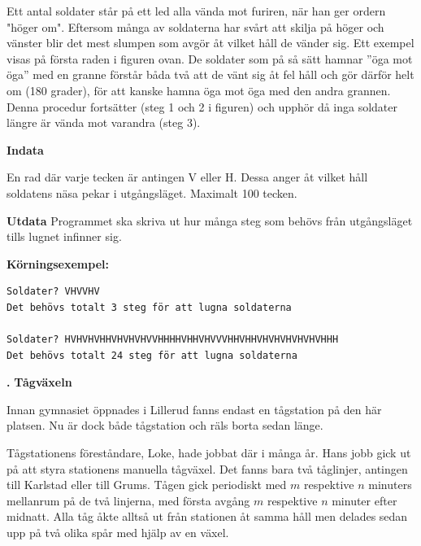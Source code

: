 \documentclass[a4paper,12pt]{article}
\newcounter{iii}\setcounter{iii}{0}
\def\i{\bigskip\noindent\refstepcounter{iii}\textbf{\arabic{iii}.} }
\begin{document}
Ett antal soldater står på ett led alla vända mot furiren, när han ger ordern "höger om". Eftersom många av soldaterna har svårt att skilja på höger och vänster blir det mest slumpen som avgör åt vilket håll de vänder sig. Ett exempel visas på första raden i figuren ovan. De soldater som på så sätt hamnar ''öga mot öga'' med en granne förstår båda två att de vänt sig åt fel håll och gör därför helt om (180 grader), för att kanske hamna öga mot öga med den andra grannen. Denna procedur fortsätter (steg 1 och 2 i figuren) och upphör då inga soldater längre är vända mot varandra (steg 3).

\textbf{Indata}

En rad där varje tecken är antingen V eller H. Dessa anger åt vilket håll soldatens näsa pekar i utgångsläget. Maximalt 100 tecken. 

\textbf{Utdata}
Programmet ska skriva ut hur många steg som behövs från utgångsläget tills lugnet infinner sig.

\textbf{Körningsexempel:}
\begin{lstlisting}
Soldater? VHVVHV
Det behövs totalt 3 steg för att lugna soldaterna

Soldater? HVHVHVHHVHVHVHVVHHHHVHHVHVVVHHVHHVHVHVHVHVHVHHH
Det behövs totalt 24 steg för att lugna soldaterna
\end{lstlisting}

\i \textbf{Tågväxeln}

Innan gymnasiet öppnades i Lillerud fanns endast en tågstation på den här platsen. Nu är dock både tågstation och räls borta sedan länge. 

Tågstationens föreståndare, Loke, hade jobbat där i många år. Hans jobb gick ut på att styra stationens manuella tågväxel. Det fanns bara två tåglinjer, antingen till Karlstad eller till Grums. Tågen gick periodiskt med $m$ respektive $n$ minuters mellanrum på de två linjerna, med första avgång $m$ respektive $n$ minuter efter midnatt. Alla tåg åkte alltså ut från stationen åt samma håll men delades sedan upp på två olika spår med hjälp av en växel. 
\end{document}
